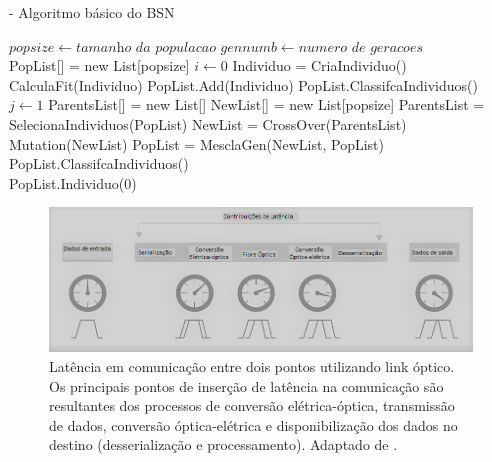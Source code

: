 \documentclass[12pt]{article}
\begin{document}
\begin{algorithm} [h]
\caption{ - Algoritmo básico do BSN}
\begin{algorithmic}[1]
\State $popsize\gets \textit{tamanho da populacao}$
\State $gennumb\gets \textit{numero de geracoes}$\\
\State PopList[] = new List[popsize]
\State $i\gets 0$
\State Individuo = CriaIndividuo()
\State CalculaFit(Individuo)\label{bsn:fitness_line}
\State PopList.Add(Individuo)
\State PopList.ClassifcaIndividuos()
\EndWhile{}\\
\State $j\gets 1$
\State ParentsList[] = new List[]
\State NewList[] = new List[popsize]
\State ParentsList = SelecionaIndividuos(PopList)
\State NewList = CrossOver(ParentsList)
\State Mutation(NewList)
\State PopList = MesclaGen(NewList, PopList)
\State PopList.ClassifcaIndividuos()
\EndWhile\\
\State\Return PopList.Individuo(0)
\end{algorithmic}
\label{pseudocode_bsn}
\end{algorithm}

\begin{figure} %
	\centering
	\includegraphics[width=12cm]{latency_link}
	\caption{Latência em comunicação entre dois pontos utilizando link óptico. Os principais pontos de inserção de latência na comunicação são resultantes dos processos de conversão elétrica-óptica, transmissão de dados, conversão óptica-elétrica e disponibilização dos dados no destino (desserialização e processamento). Adaptado de \cite{Art_Coffey}.}
	\label{fig_latency_link}
\end{figure}
\end{document}
